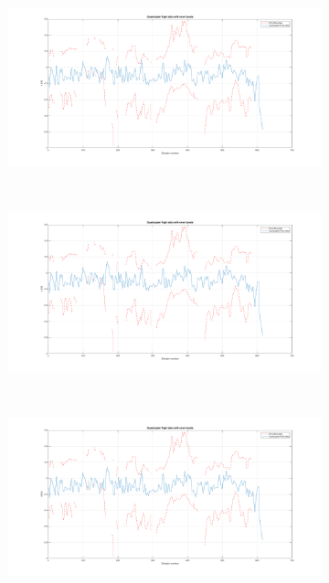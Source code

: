 \begin{figure}
  \centering
  \begin{subfigure}{0.3\textwidth}
    \includegraphics[width=\textwidth]{figures/chapter5/x}
    \caption{}
  \end{subfigure}
  ~
  \begin{subfigure}{0.3\textwidth}
    \includegraphics[width=\textwidth]{figures/chapter5/x}
    \caption{}
  \end{subfigure}
  ~
  \begin{subfigure}{0.3\textwidth}
    \includegraphics[width=\textwidth]{figures/chapter5/x}
    \caption{}
  \end{subfigure}

\end{figure}
